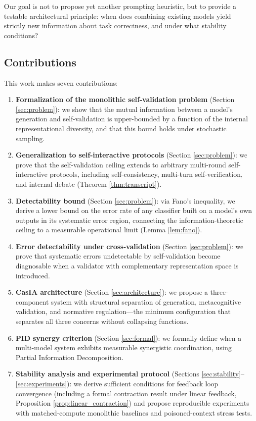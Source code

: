 \documentclass[11pt,a4paper]{article}
\theoremstyle{remark}
\begin{document}
Our goal is not to propose yet another prompting heuristic, but to provide a testable architectural principle: when does combining existing models yield strictly new information about task correctness, and under what stability conditions?

\subsection{Contributions}

This work makes seven contributions:

\begin{enumerate}
  \item \textbf{Formalization of the monolithic self-validation problem} (Section \ref{sec:problem}): we show that the mutual information between a model's generation and self-validation is upper-bounded by a function of the internal representational diversity, and that this bound holds under stochastic sampling.
  
  \item \textbf{Generalization to self-interactive protocols} (Section \ref{sec:problem}): we prove that the self-validation ceiling extends to arbitrary multi-round self-interactive protocols, including self-consistency, multi-turn self-verification, and internal debate (Theorem \ref{thm:transcript}).
  
  \item \textbf{Detectability bound} (Section \ref{sec:problem}): via Fano's inequality, we derive a lower bound on the error rate of any classifier built on a model's own outputs in its systematic error region, connecting the information-theoretic ceiling to a measurable operational limit (Lemma \ref{lem:fano}).
  
  \item \textbf{Error detectability under cross-validation} (Section \ref{sec:problem}): we prove that systematic errors undetectable by self-validation become diagnosable when a validator with complementary representation space is introduced.
  
  \item \textbf{CasIA architecture} (Section \ref{sec:architecture}): we propose a three-component system with structural separation of generation, metacognitive validation, and normative regulation---the minimum configuration that separates all three concerns without collapsing functions.
  
  \item \textbf{PID synergy criterion} (Section \ref{sec:formal}): we formally define when a multi-model system exhibits measurable synergistic coordination, using Partial Information Decomposition.
  
  \item \textbf{Stability analysis and experimental protocol} (Sections \ref{sec:stability}--\ref{sec:experiments}): we derive sufficient conditions for feedback loop convergence (including a formal contraction result under linear feedback, Proposition \ref{prop:linear_contraction}) and propose reproducible experiments with matched-compute monolithic baselines and poisoned-context stress tests.
\end{enumerate}
\end{document}
